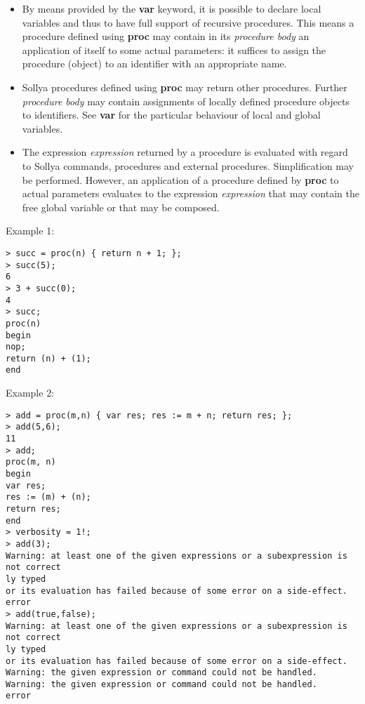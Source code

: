 \begin{itemize}
\item By means provided by the \textbf{var} keyword, it is possible to declare local
   variables and thus to have full support of recursive procedures. This
   means a procedure defined using \textbf{proc} may contain in its \emph{procedure body} 
   an application of itself to some actual parameters: it suffices
   to assign the procedure (object) to an identifier with an appropriate
   name.

\item Sollya procedures defined using \textbf{proc} may return other
   procedures. Further \emph{procedure body} may contain assignments of
   locally defined procedure objects to identifiers. See \textbf{var} for the
   particular behaviour of local and global variables.

\item The expression \emph{expression} returned by a procedure is evaluated with
   regard to Sollya commands, procedures and external
   procedures. Simplification may be performed.  However, an application
   of a procedure defined by \textbf{proc} to actual parameters evaluates to the
   expression \emph{expression} that may contain the free global variable or
   that may be composed.
\end{itemize}
\noindent Example 1: 
\begin{center}\begin{minipage}{15cm}\begin{Verbatim}[frame=single]
> succ = proc(n) { return n + 1; };
> succ(5);
6
> 3 + succ(0);
4
> succ;
proc(n)
begin
nop;
return (n) + (1);
end
\end{Verbatim}
\end{minipage}\end{center}
\noindent Example 2: 
\begin{center}\begin{minipage}{15cm}\begin{Verbatim}[frame=single]
> add = proc(m,n) { var res; res := m + n; return res; };
> add(5,6);
11
> add;
proc(m, n)
begin
var res;
res := (m) + (n);
return res;
end
> verbosity = 1!;
> add(3);
Warning: at least one of the given expressions or a subexpression is not correct
ly typed
or its evaluation has failed because of some error on a side-effect.
error
> add(true,false);
Warning: at least one of the given expressions or a subexpression is not correct
ly typed
or its evaluation has failed because of some error on a side-effect.
Warning: the given expression or command could not be handled.
Warning: the given expression or command could not be handled.
error
\end{Verbatim}
\end{minipage}\end{center}

